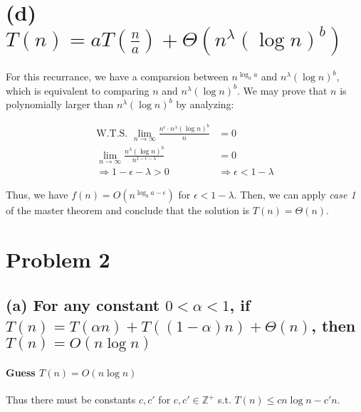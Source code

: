 \documentclass[11pt]{article}
\begin{document}
\section{(d) $T(n) = aT(\frac{n}{a}) + \Theta(n^{\lambda}(\log n)^b)$}
For this recurrance, we have a comparsion between $n^{\log_a a}$ and $n^{\lambda}(\log n)^b$, which is equivalent to comparing $n$ and $n^{\lambda}(\log n)^b$. We may prove that $n$ is polynomially larger than $n^{\lambda}(\log n)^b$ by analyzing:

\begin{align}
    \text{W.T.S. \ }\lim_{n \to \infty} \frac{n^\epsilon \cdot n^\lambda (\log n)^b}{n} &= 0\\
    \lim_{n \to \infty} \frac{n^\lambda (\log n)^b}{n^{1-\epsilon - \lambda}} &= 0 \nonumber\\
    \Longrightarrow 1-\epsilon - \lambda > 0 &\Rightarrow \epsilon < 1 - \lambda
\end{align}

Thus, we have $f(n) = O(n^{\log_b a - \epsilon})$ for $\epsilon < 1 - \lambda$. Then, we can apply \textit{case 1} of the master theorem and conclude that the solution is $T(n) = \Theta(n)$.




\section{Problem 2}


\subsection{(a) For any constant $0 < \alpha < 1$, if $T(n) = T(\alpha n) + T((1-\alpha)n) + \Theta(n)$, then $T(n) = O(n \log n)$}


\paragraph{Guess $T(n) = O(n \log n)$\newline}
Thus there must be constants $c, c'$ for $c, c'\in \mathbb{Z^+}$ s.t. $T(n) \leq cn \log n - c'n$.
\end{document}
